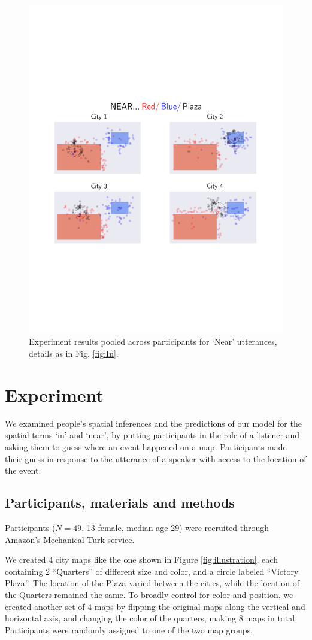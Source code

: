 \documentclass[10pt,letterpaper]{article}
\begin{document}
\begin{figure}[!]
\center
\includegraphics[width=.7\textwidth]{figures/Near.pdf}
\caption{Experiment results pooled across participants for `Near' utterances, details as in Fig. \ref{fig:In}. }
\label{fig:Near}
\end{figure}

\section{Experiment}\label{sec:exps}

We examined people's spatial inferences and the predictions of our model for the spatial terms `in' and `near', by putting participants in the role of a listener and asking them to guess where an event happened on a map. Participants made their guess in response to the utterance of a speaker with access to the location of the event. 

\subsection{Participants, materials and methods}

Participants ($N=49$, 13 female, median age 29) were recruited through Amazon's Mechanical Turk service. 

We created 4 city maps like the one shown in Figure \ref{fig:illustration}, each containing 2 ``Quarters'' of different size and color, and a circle labeled ``Victory Plaza''. The location of the Plaza varied between the cities, while the location of the Quarters remained the same. To broadly control for color and position, we created another set of 4 maps by flipping the original maps along the vertical and horizontal axis, and changing the color of the quarters, making 8 maps in total. Participants were randomly assigned to one of the two map groups. 
\end{document}
